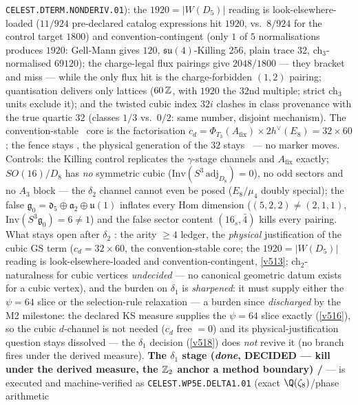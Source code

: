 \texttt{CELEST.DTERM.NONDERIV.01}): the $1920=|W(D_5)|$ reading is look-elsewhere-loaded ($11/924$
pre-declared catalog expressions hit $1920$, vs.\ $8/924$ for the control target $1800$) and
convention-contingent (only $1$ of $5$ normalisations produces $1920$: Gell-Mann gives $120$,
$\mathfrak{su}(4)$-Killing $256$, plain trace $32$, ch$_3$-normalised $69120$); the charge-legal
flux pairings give $2048/1800$ --- they bracket and miss --- while the only flux hit is the
charge-forbidden $(1,2)$ pairing; quantisation delivers only lattices ($60\,\mathbb Z$, with $1920$ the
$32$nd multiple; strict ch$_3$ units exclude it); and the twisted cubic index $32i$ clashes in
class provenance with the true quartic $32$ (classes $1/3$ vs.\ $0/2$: same number, disjoint
mechanism). The convention-stable \mE\ core is the factorisation
$c_d=\Phi_{T_3}(A_{\mathrm{fix}})\times2h^\vee(E_8)=32\times60$; the fence stays \mC, the physical
generation of the $32$ stays \mO\ --- no marker moves.
Controls: the Killing control replicates the $\gamma$-stage channels
and $A_{\mathrm{fix}}$ exactly; $SO(16)/D_8$ has \emph{no} symmetric cubic
($\mathrm{Inv}(S^3\,\mathrm{adj}_{D_8})=0$), no odd sectors and no $A_3$ block --- the $\delta_2$
channel cannot even be posed ($E_8/\mu_4$ doubly special); the false
$\mathfrak g_0=\mathfrak d_5{\oplus}\mathfrak a_2{\oplus}\mathfrak u(1)$ inflates every Hom
dimension ($(5,2,2)\neq(2,1,1)$, $\mathrm{Inv}(S^3\mathfrak g_0)=6\neq1$) and the false sector
content $(16_s,\bar4)$ kills every pairing. What stays open after $\delta_2$ \mO: the arity
$\ge4$ ledger, the \emph{physical} justification of the cubic GS term ($c_d=32\times60$, the
convention-stable core; the $1920=|W(D_5)|$ reading is look-elsewhere-loaded and
convention-contingent, \vref{v513}; ch$_2$-naturalness for cubic vertices \emph{undecided} --- no
canonical geometric datum exists for a cubic vertex), and the burden on $\delta_1$ is
\emph{sharpened}: it must supply either the $\psi=64$ slice or the selection-rule relaxation ---
a burden since \emph{discharged} by the M2 milestone: the declared KS measure supplies the
$\psi=64$ slice exactly (\vref{v516}), so the cubic $d$-channel is not needed ($c_d$ free $=0$)
and its physical-justification question stays dissolved --- the $\delta_1$ decision
(\vref{v518}) does \emph{not} revive it (no branch fires under the derived measure).
\textbf{The $\delta_1$ stage (\emph{done}, DECIDED --- kill under the derived measure, the
$\mathbb Z_2$ anchor a method boundary) \mE/\mC} --- is executed and machine-verified as
\texttt{CELEST.WP5E.DELTA1.01}
 (exact $\Q(\zeta_8)$/phase arithmetic
